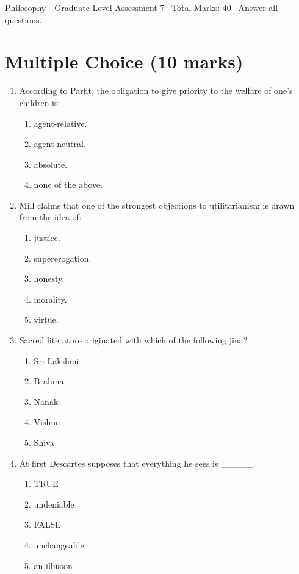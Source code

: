 \documentclass[12pt]{article}
\begin{document}
\begin{center}
Philosophy - Graduate Level Assessment 7 \
Total Marks: 40 \
Answer all questions.
\end{center}

\section*{Multiple Choice (10 marks)}
\begin{enumerate}[label=\arabic*.]
\item According to Parfit, the obligation to give priority to the welfare of one's children is:
\begin{enumerate}[label=(\alph*)]
    \item agent-relative.
    \item agent-neutral.
    \item absolute.
    \item none of the above.
\end{enumerate}
\item Mill claims that one of the strongest objections to utilitarianism is drawn from the idea of:
\begin{enumerate}[label=(\alph*)]
    \item justice.
    \item supererogation.
    \item honesty.
    \item morality.
    \item virtue.
\end{enumerate}
\item Sacred literature originated with which of the following jina?
\begin{enumerate}[label=(\alph*)]
    \item Sri Lakshmi
    \item Brahma
    \item Nanak
    \item Vishnu
    \item Shiva
\end{enumerate}
\item At first Descartes supposes that everything he sees is \_\_\_\_\_.
\begin{enumerate}[label=(\alph*)]
    \item TRUE
    \item undeniable
    \item FALSE
    \item unchangeable
    \item an illusion

\end{enumerate}
\end{enumerate}
\end{document}
